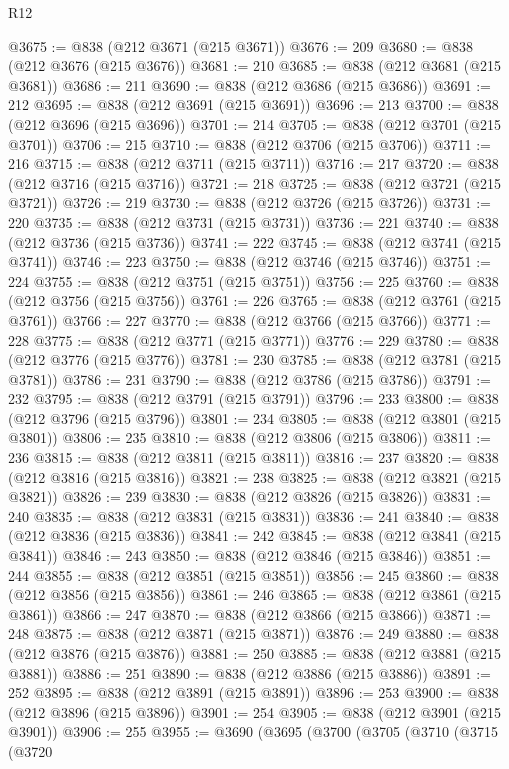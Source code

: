 \begin{lexlean}{R12}
\begin{coremodule}
@3675 := @838 (@212 @3671 (@215 @3671))
@3676 := 209
@3680 := @838 (@212 @3676 (@215 @3676))
@3681 := 210
@3685 := @838 (@212 @3681 (@215 @3681))
@3686 := 211
@3690 := @838 (@212 @3686 (@215 @3686))
@3691 := 212
@3695 := @838 (@212 @3691 (@215 @3691))
@3696 := 213
@3700 := @838 (@212 @3696 (@215 @3696))
@3701 := 214
@3705 := @838 (@212 @3701 (@215 @3701))
@3706 := 215
@3710 := @838 (@212 @3706 (@215 @3706))
@3711 := 216
@3715 := @838 (@212 @3711 (@215 @3711))
@3716 := 217
@3720 := @838 (@212 @3716 (@215 @3716))
@3721 := 218
@3725 := @838 (@212 @3721 (@215 @3721))
@3726 := 219
@3730 := @838 (@212 @3726 (@215 @3726))
@3731 := 220
@3735 := @838 (@212 @3731 (@215 @3731))
@3736 := 221
@3740 := @838 (@212 @3736 (@215 @3736))
@3741 := 222
@3745 := @838 (@212 @3741 (@215 @3741))
@3746 := 223
@3750 := @838 (@212 @3746 (@215 @3746))
@3751 := 224
@3755 := @838 (@212 @3751 (@215 @3751))
@3756 := 225
@3760 := @838 (@212 @3756 (@215 @3756))
@3761 := 226
@3765 := @838 (@212 @3761 (@215 @3761))
@3766 := 227
@3770 := @838 (@212 @3766 (@215 @3766))
@3771 := 228
@3775 := @838 (@212 @3771 (@215 @3771))
@3776 := 229
@3780 := @838 (@212 @3776 (@215 @3776))
@3781 := 230
@3785 := @838 (@212 @3781 (@215 @3781))
@3786 := 231
@3790 := @838 (@212 @3786 (@215 @3786))
@3791 := 232
@3795 := @838 (@212 @3791 (@215 @3791))
@3796 := 233
@3800 := @838 (@212 @3796 (@215 @3796))
@3801 := 234
@3805 := @838 (@212 @3801 (@215 @3801))
@3806 := 235
@3810 := @838 (@212 @3806 (@215 @3806))
@3811 := 236
@3815 := @838 (@212 @3811 (@215 @3811))
@3816 := 237
@3820 := @838 (@212 @3816 (@215 @3816))
@3821 := 238
@3825 := @838 (@212 @3821 (@215 @3821))
@3826 := 239
@3830 := @838 (@212 @3826 (@215 @3826))
@3831 := 240
@3835 := @838 (@212 @3831 (@215 @3831))
@3836 := 241
@3840 := @838 (@212 @3836 (@215 @3836))
@3841 := 242
@3845 := @838 (@212 @3841 (@215 @3841))
@3846 := 243
@3850 := @838 (@212 @3846 (@215 @3846))
@3851 := 244
@3855 := @838 (@212 @3851 (@215 @3851))
@3856 := 245
@3860 := @838 (@212 @3856 (@215 @3856))
@3861 := 246
@3865 := @838 (@212 @3861 (@215 @3861))
@3866 := 247
@3870 := @838 (@212 @3866 (@215 @3866))
@3871 := 248
@3875 := @838 (@212 @3871 (@215 @3871))
@3876 := 249
@3880 := @838 (@212 @3876 (@215 @3876))
@3881 := 250
@3885 := @838 (@212 @3881 (@215 @3881))
@3886 := 251
@3890 := @838 (@212 @3886 (@215 @3886))
@3891 := 252
@3895 := @838 (@212 @3891 (@215 @3891))
@3896 := 253
@3900 := @838 (@212 @3896 (@215 @3896))
@3901 := 254
@3905 := @838 (@212 @3901 (@215 @3901))
@3906 := 255
@3955 := @3690
    (@3695
      (@3700
        (@3705
          (@3710
            (@3715
              (@3720

\end{coremodule}
\end{lexlean}
